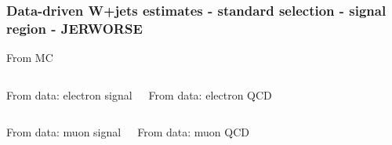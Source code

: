 \documentclass[red,compress,xcolor=table]{beamer}
\begin{document}
\begin{frame}
  \frametitle{Data-driven W+jets estimates - standard selection - signal region - JERWORSE}

\vspace*{-0.5cm}
\begin{block}{\scriptsize From MC}
\begin{center}
    {\tiny
      
    }
\end{center}
  \end{block}

\vspace*{-0.2cm}
\begin{columns}
  \begin{block}{\scriptsize From data: electron signal}
    {\tiny
      
    }
  \end{block}
  \begin{block}{\scriptsize From data: electron QCD}
    {\tiny
      
    }
  \end{block}
\end{columns}
\begin{columns}
  \begin{block}{\scriptsize From data: muon signal}
    {\tiny
      
    }
  \end{block}
  \begin{block}{\scriptsize From data: muon QCD}
    {\tiny
      
    }
  \end{block}
\end{columns}


\end{frame}
\end{document}
